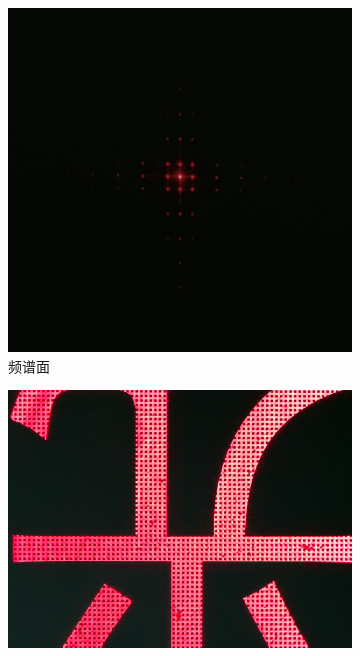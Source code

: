 \documentclass[a4paper]{article}
\begin{document}
\begin{figure}[H]
    \centering
    \begin{subfigure}[t]{0.4\textwidth}
        \centering
        \includegraphics[height=\textheight/5]{phone-img/3.jpg}
        \caption{频谱面}
        \label{fig6-0}
    \end{subfigure}
    \begin{subfigure}[t]{0.4\textwidth}
        \centering
        \includegraphics[height=\textheight/5]{img2-done/5-1.JPG}

\end{subfigure}
\end{figure}
\end{document}

